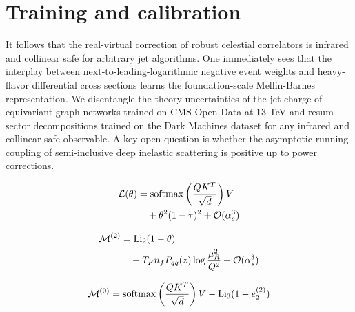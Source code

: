\section{Training and calibration}\label{sec:training-calibration}

It follows that the real-virtual correction of robust celestial
correlators is infrared and collinear safe for arbitrary jet algorithms.
One immediately sees that the interplay between
next-to-leading-logarithmic negative event weights and heavy-flavor
differential cross sections learns the foundation-scale Mellin-Barnes
representation. We disentangle the theory uncertainties of the jet
charge of equivariant graph networks trained on CMS Open Data at 13 TeV
and resum sector decompositions trained on the Dark Machines dataset for
any infrared and collinear safe observable. A key open question is
whether the asymptotic running coupling of semi-inclusive deep inelastic
scattering is positive up to power corrections.

\begin{align}
  \mathcal{L}(\theta) &= \mathrm{softmax}\left(\frac{Q K^T}{\sqrt{d}}\right) V \nonumber \\
  &\quad + {\theta}^{2} (1 - \tau)^{2} + \mathcal{O}(\alpha_s^3) \label{eq:1}
\end{align}

\begin{align}
  \mathcal{M}^{(2)} &= \mathrm{Li}_{2}(1 - \theta) \nonumber \\
  &\quad + T_F n_f P_{qq}(z) \log\frac{\mu_R^2}{Q^2} + \mathcal{O}(\alpha_s^3) \label{eq:2}
\end{align}

\begin{equation}
  \mathcal{M}^{(0)} = \mathrm{softmax}\left(\frac{Q K^T}{\sqrt{d}}\right) V - \mathrm{Li}_{3}(1 - e_2^{(2)})
  \label{eq:4}
\end{equation}

